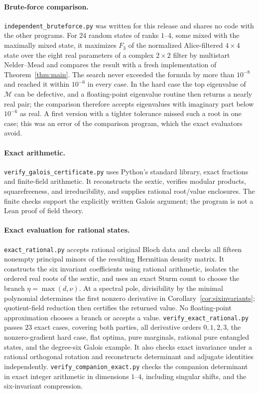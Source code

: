 \documentclass[11pt]{article}
\theoremstyle{remark}\newtheorem{remark}[theorem]{Remark}
\begin{document}
\paragraph{Brute-force comparison.}
\texttt{independent\_bruteforce.py} was written for this release and shares
no code with the other programs. For $24$ random states of ranks $1$--$4$,
some mixed with the maximally mixed state, it maximizes $F_3$ of the
normalized Alice-filtered $4\times4$ state over the eight real parameters
of a complex $2\times2$ filter by multistart Nelder--Mead and compares the
result with a fresh implementation of Theorem~\ref{thm:main}. The search
never exceeded the formula by more than $10^{-8}$ and reached it within
$10^{-6}$ in every case. In the hard case the top eigenvalue of
$\mathscr M$ can be defective, and a floating-point eigenvalue routine
then returns a nearly real pair; the comparison therefore accepts
eigenvalues with imaginary part below $10^{-6}$ as real. A first version
with a tighter tolerance missed such a root in one case; this was an error
of the comparison program, which the exact evaluators avoid.

\paragraph{Exact arithmetic.}
\texttt{verify\_galois\_certificate.py} uses Python's standard library,
exact fractions and finite-field arithmetic. It reconstructs the sextic,
verifies modular products, squarefreeness, and irreducibility, and supplies
rational root/value enclosures. The finite checks support the explicitly
written Galois argument; the program is not a Lean proof of field theory.

\paragraph{Exact evaluation for rational states.}
\texttt{exact\_rational.py} accepts rational original Bloch data and checks
all fifteen nonempty principal minors of the resulting Hermitian density
matrix. It constructs the six invariant coefficients using rational arithmetic,
isolates the ordered real roots of the sextic, and uses an exact Sturm count
to choose the branch $\eta=\max(d,\nu)$. At a spectral pole, divisibility by
the minimal polynomial determines the first nonzero derivative in
Corollary~\ref{cor:sixinvariants}; quotient-field reduction then certifies
the returned value. No floating-point approximation chooses a branch or
accepts a value. \texttt{verify\_exact\_rational.py} passes $23$ exact cases,
covering both parties, all derivative orders $0,1,2,3$, the nonzero-gradient
hard case, flat optima, pure marginals, rational pure entangled states, and
the degree-six Galois example. It also checks exact invariance under a
rational orthogonal rotation and reconstructs determinant and adjugate
identities independently. \texttt{verify\_companion\_exact.py} checks the
companion determinant in exact integer arithmetic in dimensions $1$--$4$,
including singular shifts, and the six-invariant compression.
\end{document}

